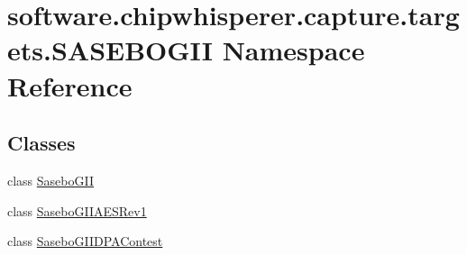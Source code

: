 \hypertarget{namespacesoftware_1_1chipwhisperer_1_1capture_1_1targets_1_1SASEBOGII}{}\section{software.\+chipwhisperer.\+capture.\+targets.\+S\+A\+S\+E\+B\+O\+G\+I\+I Namespace Reference}
\label{namespacesoftware_1_1chipwhisperer_1_1capture_1_1targets_1_1SASEBOGII}
\subsection*{Classes}
\begin{DoxyCompactItemize}
\item 
class \hyperlink{classsoftware_1_1chipwhisperer_1_1capture_1_1targets_1_1SASEBOGII_1_1SaseboGII}{Sasebo\+G\+I\+I}
\item 
class \hyperlink{classsoftware_1_1chipwhisperer_1_1capture_1_1targets_1_1SASEBOGII_1_1SaseboGIIAESRev1}{Sasebo\+G\+I\+I\+A\+E\+S\+Rev1}
\item 
class \hyperlink{classsoftware_1_1chipwhisperer_1_1capture_1_1targets_1_1SASEBOGII_1_1SaseboGIIDPAContest}{Sasebo\+G\+I\+I\+D\+P\+A\+Contest}
\end{DoxyCompactItemize}
